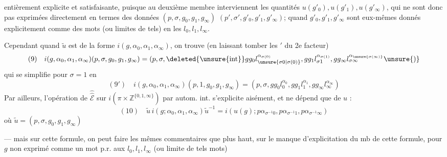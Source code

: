 entièrement explicite et satisfaisante, puisque au deuxième membre interviennent les quantités $u(g'_0),u(g'_1),u(g'_\infty)$, qui ne sont donc pas exprimées directement en termes des  données $(p,\sigma,g_0,g_1,g_\infty)$ $(p',\sigma',g'_0,g'_1,g'_\infty)$;  quand $g'_0,g'_1,g'_\infty$ sont eux-mêmes donnés explicitement comme des mots (ou limites de tels) en les $l_0,l_1,l_\infty$.

Cependant quand $\tilde u$ est de la forme $i(g,\alpha_0,\alpha_1,\alpha_\infty)$, on trouve (en laissant tomber les $'$ du 2e facteur)
\[
(9)\quad i(g,\alpha_0,\alpha_1,\alpha_\infty)(p,\sigma,g_0,g_1,g_\infty)=(p,\sigma,\deleted{\unsure{\operatorname{int}}}gg_0l_{\unsure{\sigma0|\sigma(0)}}^{\alpha_{\sigma(0)}},gg_1l_{\sigma1}^{\alpha_{\sigma(1)}},gg_\infty l_{\sigma\infty}^{\alpha_{\unsure{\sigma(\infty)}}}\unsure{)}
\]
qui se simplifie pour $\sigma=1$ en
\[
(9')\quad i(g,\alpha_0,\alpha_1,\alpha_\infty)(p,1,g_0,g_1,g_\infty)=(p,\sigma,gg_0l_0^{\alpha_0},gg_1l_1^{\alpha_1},gg_\infty l_\infty^{\alpha_\infty})
\]
Par ailleurs, l'opération de $\widehat{\widehat{\mathcal E}}$ sur $i(\pi\times\mathbb Z^{\{0,1,\infty\}})$ par autom. int. s'explicite aisément, et ne dépend que de $u$ :
\[
(10)\quad\tilde u\,i(g;\alpha_0,\alpha_1,\alpha_\infty)\tilde u^{-1}=i(u(g);p\alpha_{\sigma^{-1}0},p\alpha_{\sigma^{-1}1},p\alpha_{\sigma^{-1}\infty})
\]
où $\tilde u=(p,\sigma,g_0,g_1,g_\infty)$

--- mais sur cette formule, on peut faire les mêmes commentaires que plus haut, sur le manque d'explicitation du  mb de cette formule, pour $g$ non exprimé comme un mot p.r. aux $l_0,l_1,l_\infty$ (ou limite de tels mots)
